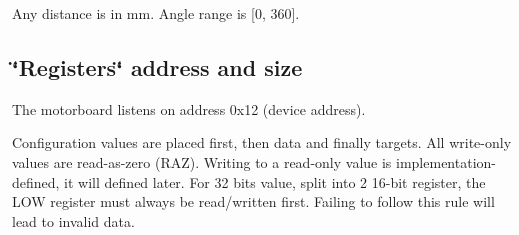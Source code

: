 Any distance is in mm. Angle range is \mbox{[}0, 360\mbox{]}.

\subsection*{\char`\"{}\+Registers\char`\"{} address and size}

The motorboard listens on address 0x12 (device address).

Configuration values are placed first, then data and finally targets. All write-\/only values are read-\/as-\/zero (R\+AZ). Writing to a read-\/only value is implementation-\/defined, it will defined later. For 32 bits value, split into 2 16-\/bit register, the L\+OW register must always be read/written first. Failing to follow this rule will lead to invalid data.

